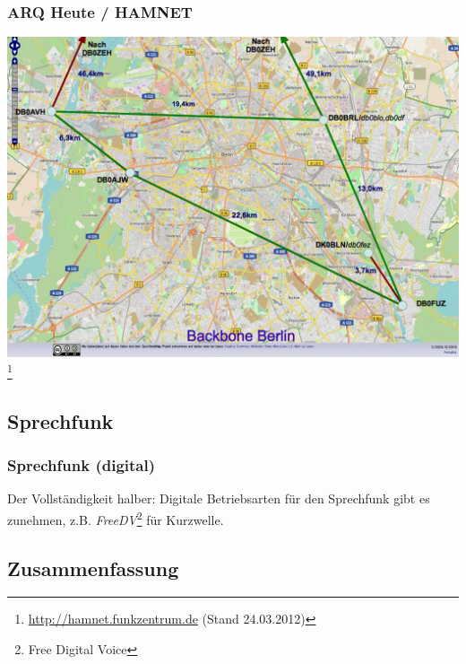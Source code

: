 \begin{frame}
    \frametitle{ARQ Heute / HAMNET}

    \begin{center}
        \includegraphics[width=1\textwidth]{e16/backbone_berlin1201.jpg}
        \footnote{\url{http://hamnet.funkzentrum.de} (Stand 24.03.2012)}
    \end{center}

\end{frame}

\subsection{Sprechfunk}

\begin{frame}
    \frametitle{Sprechfunk (digital)}


    Der Vollständigkeit halber: Digitale Betriebsarten für den Sprechfunk gibt
    es zunehmen, z.B. \emph{FreeDV}\footnote{Free Digital Voice} für Kurzwelle.

\end{frame}

\subsection{Zusammenfassung}

